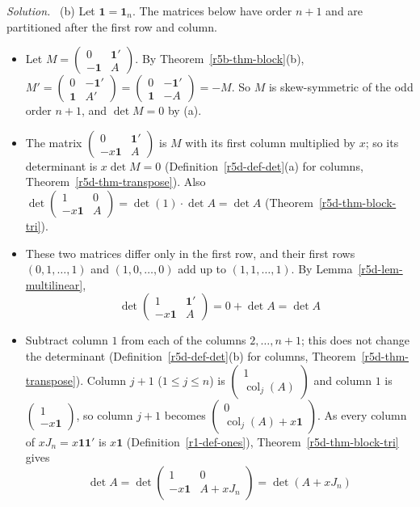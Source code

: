 \documentclass[12pt]{article}
\newcommand{\one}{\mathbf 1}
\DeclareMathOperator{\col}{col}
\theoremstyle{definition}
\newenvironment{solution}{\par\noindent\textit{Solution.}\ }{\par\smallskip}
\begin{document}
\begin{solution}
(b) Let \(\one=\one_n\). The matrices below have order \(n+1\) and are partitioned after the first row and column.
\begin{itemize}
\item Let \(M=\left(\begin{smallmatrix}0&\one'\\-\one&A\end{smallmatrix}\right)\). By Theorem~\ref{r5b-thm-block}(b),
\(M'=\left(\begin{smallmatrix}0&-\one'\\\one&A'\end{smallmatrix}\right)=\left(\begin{smallmatrix}0&-\one'\\\one&-A\end{smallmatrix}\right)=-M\).
So \(M\) is skew-symmetric of the odd order \(n+1\), and \(\det M=0\) by (a).
\item The matrix \(\left(\begin{smallmatrix}0&\one'\\-x\one&A\end{smallmatrix}\right)\) is \(M\) with its first column
multiplied by \(x\); so its determinant is \(x\det M=0\) (Definition~\ref{r5d-def-det}(a) for columns,
Theorem~\ref{r5d-thm-transpose}). Also
\(\det\left(\begin{smallmatrix}1&0\\-x\one&A\end{smallmatrix}\right)=\det(1)\cdot\det A=\det A\)
(Theorem~\ref{r5d-thm-block-tri}).
\item These two matrices differ only in the first row, and their first rows \((0,1,\dots,1)\) and \((1,0,\dots,0)\) add up
to \((1,1,\dots,1)\). By Lemma~\ref{r5d-lem-multilinear},
\[
\det\begin{pmatrix}1&\one'\\-x\one&A\end{pmatrix}=0+\det A=\det A
\]
\item Subtract column \(1\) from each of the columns \(2,\dots,n+1\); this does not change the determinant
(Definition~\ref{r5d-def-det}(b) for columns, Theorem~\ref{r5d-thm-transpose}). Column \(j+1\) (\(1\leqslant j\leqslant n\))
is \(\left(\begin{smallmatrix}1\\\col_j(A)\end{smallmatrix}\right)\) and column \(1\) is
\(\left(\begin{smallmatrix}1\\-x\one\end{smallmatrix}\right)\), so column \(j+1\) becomes
\(\left(\begin{smallmatrix}0\\\col_j(A)+x\one\end{smallmatrix}\right)\). As every column of \(xJ_n=x\one\one'\) is \(x\one\)
(Definition~\ref{r1-def-ones}), Theorem~\ref{r5d-thm-block-tri} gives
\[
\det A=\det\begin{pmatrix}1&0\\-x\one&A+xJ_n\end{pmatrix}=\det(A+xJ_n)
\]
\end{itemize}
\end{solution}
\end{document}
